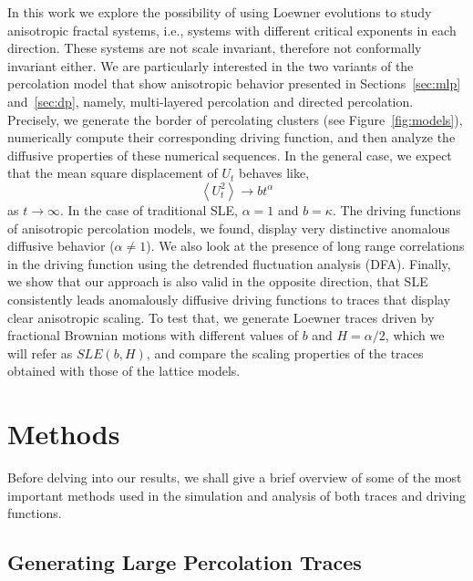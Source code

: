 In this work we explore the possibility of using Loewner evolutions to study
anisotropic fractal systems, i.e., systems with different critical exponents in
each direction. These systems are not scale invariant, therefore not
conformally invariant either. We are particularly interested in the two
variants of the percolation model that show anisotropic behavior presented in
Sections~\ref{sec:mlp} and~\ref{sec:dp}, namely, multi-layered percolation and
directed percolation. Precisely, we generate the border of percolating
clusters (see Figure~\ref{fig:models}), numerically compute their corresponding
driving function, and then analyze the diffusive properties of these numerical
sequences. In the general case, we expect that the mean square displacement of
$U_t$ behaves like,
\begin{equation}
    \label{eq:diff}
    \left\langle U_t^2 \right\rangle \rightarrow b t^\alpha
\end{equation} 
as $t\rightarrow\infty$. In the case of traditional SLE, $\alpha=1$ and
$b=\kappa$.  The driving functions of anisotropic percolation models, we found,
display very distinctive anomalous diffusive behavior ($\alpha\neq1$). We also
look at the presence of long range correlations in the driving function using
the detrended fluctuation analysis (DFA). Finally, we show that our approach is
also valid in the opposite direction, that SLE consistently leads
anomalously diffusive driving functions to traces that display clear
anisotropic scaling. To test that, we generate Loewner traces driven by
fractional Brownian motions with different values of $b$ and $H=\alpha/2$,
which we will refer as $SLE(b,H)$, and compare the scaling properties of the
traces obtained with those of the lattice models.

\section{Methods}
\label{sec:methods}

Before delving into our results, we shall give a brief overview of some of the
most important methods used in the simulation and analysis of both traces
and driving functions.

\subsection{Generating Large Percolation Traces}
\label{sec:hulls}

